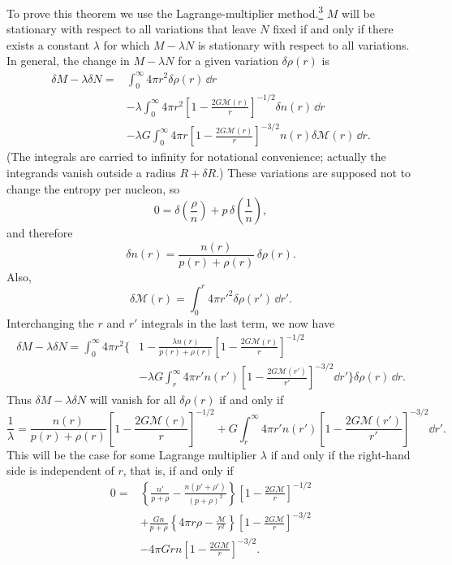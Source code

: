 To prove this theorem we use the Lagrange-multiplier
method.\hyperref[ch11-ref-3]{\textsuperscript{3}} \(M\) will be stationary
with respect to all variations that leave \(N\) fixed if and only if there
exists a constant \(\lambda\) for which \(M-\lambda N\) is stationary with
respect to all variations. In general, the change in \(M-\lambda N\) for a
given variation \(\delta\rho(r)\) is
\[
  \begin{aligned}
  \delta M-\lambda\delta N
  ={}&
  \int_0^\infty4\pi r^2\delta\rho(r)\,\dd r\\
  &-\lambda\int_0^\infty4\pi r^2
  \left[1-\frac{2G\mathcal{M}(r)}r\right]^{-1/2}
  \delta n(r)\,\dd r\\
  &-\lambda G\int_0^\infty4\pi r
  \left[1-\frac{2G\mathcal{M}(r)}r\right]^{-3/2}
  n(r)\delta\mathcal{M}(r)\,\dd r.
  \end{aligned}
\]
(The integrals are carried to infinity for notational convenience; actually
the integrands vanish outside a radius \(R+\delta R\).) These variations are
supposed not to change the entropy per nucleon, so
\[
  0=\delta\left(\frac{\rho}{n}\right)
  +p\,\delta\left(\frac1n\right),
\]
and therefore
\[
  \delta n(r)=\frac{n(r)}{p(r)+\rho(r)}\,\delta\rho(r).
\]
Also,
\[
  \delta\mathcal{M}(r)
  =\int_0^r4\pi r'^2\delta\rho(r')\,\dd r'.
\]
Interchanging the \(r\) and \(r'\) integrals in the last term, we now have
\[
  \begin{aligned}
  \delta M-\lambda\delta N
  =\int_0^\infty4\pi r^2
  \bigg\{&
  1-\frac{\lambda n(r)}{p(r)+\rho(r)}
  \left[1-\frac{2G\mathcal{M}(r)}r\right]^{-1/2}\\
  &-\lambda G\int_r^\infty4\pi r'n(r')
  \left[1-\frac{2G\mathcal{M}(r')}{r'}\right]^{-3/2}\dd r'
  \bigg\}\delta\rho(r)\,\dd r.
  \end{aligned}
\]
Thus \(\delta M-\lambda\delta N\) will vanish for all \(\delta\rho(r)\) if and
only if
\[
  \frac1\lambda
  =
  \frac{n(r)}{p(r)+\rho(r)}
  \left[1-\frac{2G\mathcal{M}(r)}r\right]^{-1/2}
  +G\int_r^\infty4\pi r'n(r')
  \left[1-\frac{2G\mathcal{M}(r')}{r'}\right]^{-3/2}\dd r'.
\]
This will be the case for some Lagrange multiplier \(\lambda\) if and only if
the right-hand side is independent of \(r\), that is, if and only if
\[
  \begin{aligned}
  0={}&
  \left\{
    \frac{n'}{p+\rho}
    -\frac{n(p'+\rho')}{(p+\rho)^2}
  \right\}
  \left[1-\frac{2G\mathcal{M}}r\right]^{-1/2}\\
  &+\frac{Gn}{p+\rho}
  \left\{4\pi r\rho-\frac{\mathcal{M}}{r^2}\right\}
  \left[1-\frac{2G\mathcal{M}}r\right]^{-3/2}\\
  &-4\pi Grn
  \left[1-\frac{2G\mathcal{M}}r\right]^{-3/2}.
  \end{aligned}
\]
